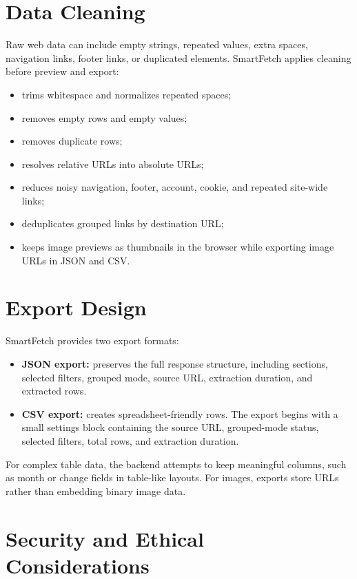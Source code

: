 \documentclass[11pt,a4paper]{article}
\begin{document}
\section{Data Cleaning}

Raw web data can include empty strings, repeated values, extra spaces, navigation links, footer links, or duplicated elements. SmartFetch applies cleaning before preview and export:

\begin{itemize}
  \item trims whitespace and normalizes repeated spaces;
  \item removes empty rows and empty values;
  \item removes duplicate rows;
  \item resolves relative URLs into absolute URLs;
  \item reduces noisy navigation, footer, account, cookie, and repeated site-wide links;
  \item deduplicates grouped links by destination URL;
  \item keeps image previews as thumbnails in the browser while exporting image URLs in JSON and CSV.
\end{itemize}

\section{Export Design}

SmartFetch provides two export formats:

\begin{itemize}
  \item \textbf{JSON export:} preserves the full response structure, including sections, selected filters, grouped mode, source URL, extraction duration, and extracted rows.
  \item \textbf{CSV export:} creates spreadsheet-friendly rows. The export begins with a small settings block containing the source URL, grouped-mode status, selected filters, total rows, and extraction duration.
\end{itemize}

For complex table data, the backend attempts to keep meaningful columns, such as month or change fields in table-like layouts. For images, exports store URLs rather than embedding binary image data.

\section{Security and Ethical Considerations}
\end{document}
